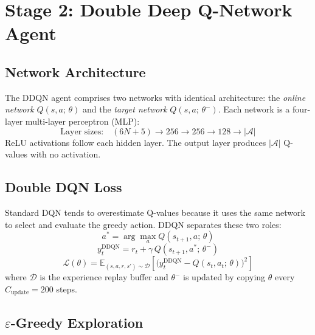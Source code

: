 \section{Stage 2: Double Deep Q-Network Agent}
\label{sec:ddqn}

\subsection{Network Architecture}

The DDQN agent comprises two networks with identical architecture:
the \emph{online network} $Q(s, a;\, \theta)$ and the
\emph{target network} $Q(s, a;\, \theta^-)$. Each network is a
four-layer multi-layer perceptron (MLP):
\begin{equation}
  \text{Layer sizes:} \quad
  (6N{+}5) \rightarrow 256 \rightarrow 256 \rightarrow 128 \rightarrow |\mathcal{A}|
  \label{eq:network_arch}
\end{equation}
ReLU activations follow each hidden layer. The output layer
produces $|\mathcal{A}|$ Q-values with no activation.

\subsection{Double DQN Loss}

Standard DQN tends to overestimate Q-values because it uses the
same network to select and evaluate the greedy action. DDQN
separates these two roles:
\begin{equation}
  a^* = \arg\max_{a} Q(s_{t+1}, a;\, \theta)
  \label{eq:ddqn_action_select}
\end{equation}
\begin{equation}
  y_t^{\text{DDQN}} = r_t + \gamma \,
    Q(s_{t+1}, a^*;\, \theta^-)
  \label{eq:ddqn_target}
\end{equation}
\begin{equation}
  \mathcal{L}(\theta) = \mathbb{E}_{(s,a,r,s') \sim \mathcal{D}}
  \!\left[
    \bigl( y_t^{\text{DDQN}} - Q(s_t, a_t;\, \theta) \bigr)^2
  \right]
  \label{eq:ddqn_loss}
\end{equation}
where $\mathcal{D}$ is the experience replay buffer and
$\theta^-$ is updated by copying $\theta$ every
$C_{\text{update}} = 200$ steps.

\subsection{$\varepsilon$-Greedy Exploration}

